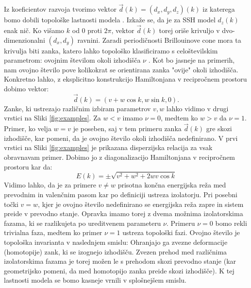Iz koeficientov razvoja tvorimo vektor $\vec{d}(k) = (d_x,d_y,d_z)(k)$ iz katerega bomo dobili topološke lastnosti modela \cite{madzar}. Izkaže se, da je za SSH model $d_z(k)$ enak nič. Ko višamo $k$ od $0$ proti $2 \pi$, vektor $\vec{d}(k)$ torej oriše krivuljo v dvo-dimenzionalni $(d_x,d_y)$ ravnini. Zaradi periodičnosti Brillouinove cone mora ta krivulja biti zanka, katero lahko topološko klasificiramo s celoštevilskim parametrom: ovojnim številom okoli izhodišča $\nu$ \cite{hatcher}. Kot bo jasneje na primerih, nam ovojno število pove kolikokrat se orientirana zanka "ovije" okoli izhodišča.
Konkretno lahko, z eksplicitno konstrukcijo Hamiltonjana v recipročnem prostoru dobimo vektor:
\begin{equation}
\vec{d}(k) = (v + w \cos k, w \sin k, 0).
\end{equation}
Zanke, ki ustrezajo različnim izbiram parametrov $v, w$ lahko vidimo v drugi vrstici na Sliki \ref{fig:examples}. Za $w < v$ imamo $\nu = 0$, medtem ko $w > v$ da $\nu=1$. Primer, ko velja $w=v$ je poseben, saj v tem primeru zanka $\vec{d}(k)$ gre skozi izhodišče, kar pomeni, da je ovojno število okoli izhodišča nedefinirano.
V prvi vrstici na Sliki \ref{fig:examples} je prikazana disperzijska relacija za vsak obravnavam primer. Dobimo jo z diagonalizacijo Hamiltonjana v recipročnem prostoru kar da:
\begin{equation}
E(k) = \pm \sqrt{v^2 + w^2 + 2 w v \cos k}
\end{equation}
Vidimo lahko, da je za primere $v \neq w$ prisotna končna energijska reža med prevodnim in valenčnim pasom kar po definiciji ustreza izolatorju. Pri posebni točki $v=w$, kjer je ovojno število nedefinirano se energijska reža zapre in sistem preide v prevodno stanje. Opravka imamo torej z dvema možnima izolatorskima fazama, ki se razlikujeta po ureditvenem parameteru $\nu$. Primeru $\nu=0$ bomo rekli trivialna faza, medtem ko primer $\nu=1$ ustreza topološki fazi. Ovojno število je topološka invarianta v naslednjem smislu: Ohranjajo ga zvezne deformacije (homotopije) zank, ki se izognejo izhodišču. Zvezen prehod med različnima izolatorskima fazama je torej možen le s prehodom skozi prevodno stanje (kar geometrijsko pomeni, da med homotopijo zanka preide skozi izhodišče). K tej lastnosti modela se bomo kasneje vrnili v splošnejšem smislu.

